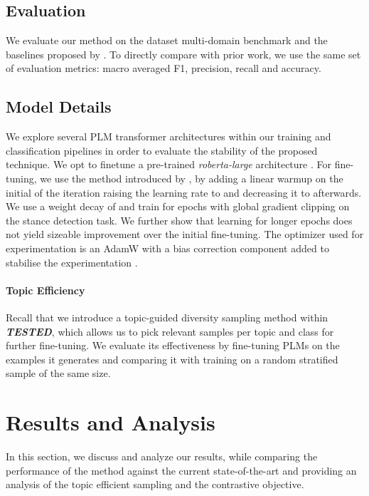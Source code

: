 \documentclass[11pt]{article}
\begin{document}
\subsection{Evaluation}
We evaluate our method on the  dataset multi-domain benchmark and the baselines proposed by \citet{hardalov2021cross}. To directly compare with prior work, we use the same set of evaluation metrics: macro averaged F1, precision, recall and accuracy.

\subsection{Model Details}

We explore several PLM transformer architectures within our training and classification pipelines in order to evaluate the stability of the proposed technique. We opt to finetune a pre-trained \textit{roberta-large} architecture \cite{liu2019roberta, conneau2019unsupervised}. For fine-tuning, we use the method introduced by \citet{mosbach2020stability}, by adding a linear warmup on the initial  of the iteration raising the learning rate to  and decreasing it to  afterwards. We use a weight decay of  and train for  epochs with global gradient clipping on the stance detection task. We further show that learning for longer epochs does not yield sizeable improvement over the initial fine-tuning. The optimizer used for experimentation is an AdamW \citep{loshchilov2017decoupled} with a bias correction component added to stabilise the experimentation \citep{mosbach2020stability}. 

\paragraph{Topic Efficiency}

Recall that we introduce a topic-guided diversity sampling method within \textbf{\textit{TESTED}}, which allows us to pick relevant samples per topic and class for further fine-tuning. We evaluate its effectiveness by fine-tuning PLMs on the examples it generates and comparing it with training on a random stratified sample of the same size. 


\section{Results and Analysis}

In this section, we discuss and analyze our results, while comparing the performance of the method against the current state-of-the-art \citep{hardalov2021cross} and providing an analysis of the topic efficient sampling and the contrastive objective.
\end{document}

